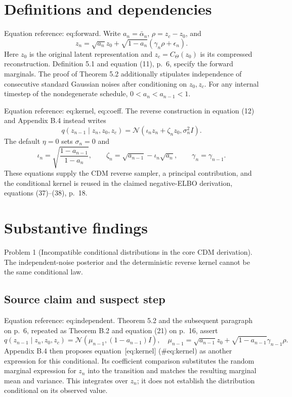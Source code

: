 \documentclass[10pt]{article}
\begin{document}
\section*{Definitions and dependencies}
Equation reference: eq:forward. Write \(a_n=\bar\alpha_n\), \(\rho=z_c-z_0\), and \[
 z_n=\sqrt{a_n}z_0+\sqrt{1-a_n}(\gamma_n\rho+\epsilon_n).\] Here \(z_0\) is the original latent representation and \(z_c=C_\Theta(z_0)\) is its compressed reconstruction. Definition 5.1 and equation (11), p. 6, specify the forward marginals. The proof of Theorem 5.2 additionally stipulates independence of consecutive standard Gaussian noises after conditioning on \(z_0,z_c\). For any internal timestep of the nondegenerate schedule, \(0<a_n<a_{n-1}<1\).\par
Equation reference: eq:kernel, eq:coeff. The reverse construction in equation (12) and Appendix B.4 instead writes \[
 q(z_{n-1}\mid z_n,z_0,z_c)
 =\mathcal N(\iota_nz_n+\zeta_nz_0,\sigma_n^2I).\] The default \(\eta=0\) sets \(\sigma_n=0\) and \[
 \iota_n=\sqrt{\frac{1-a_{n-1}}{1-a_n}},
 \qquad
 \zeta_n=\sqrt{a_{n-1}}-\iota_n\sqrt{a_n},
 \qquad
 \gamma_n=\gamma_{n-1}.\] These equations supply the CDM reverse sampler, a principal contribution, and the conditional kernel is reused in the claimed negative-ELBO derivation, equations (37)–(38), p. 18.\par
\section*{Substantive findings}
Problem 1 (Incompatible conditional distributions in the core CDM derivation).  The independent-noise posterior and the deterministic reverse kernel cannot be the same conditional law.\par
\subsection*{Source claim and suspect step}
Equation reference: eq:independent. Theorem 5.2 and the subsequent paragraph on p. 6, repeated as Theorem B.2 and equation (21) on p. 16, assert \[
 q(z_{n-1}\mid z_n,z_0,z_c)
 =\mathcal N(\mu_{n-1},(1-a_{n-1})I),
 \quad
 \mu_{n-1}=\sqrt{a_{n-1}}z_0+
 \sqrt{1-a_{n-1}}\gamma_{n-1}\rho.\] Appendix B.4 then proposes equation [eq:kernel] (\#eq:kernel) as another expression for this conditional. Its coefficient comparison substitutes the random marginal expression for \(z_n\) into the transition and matches the resulting marginal mean and variance. This integrates over \(z_n\); it does not establish the distribution conditional on its observed value.\par
\end{document}
